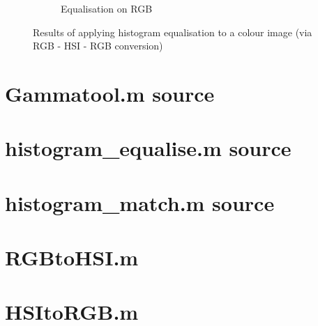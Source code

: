 \documentclass[a4paper]{article}
\begin{document}
\begin{figure}[!h]
\begin{subfigure}[b]{0.3\textwidth}
                \caption{Equalisation on RGB}
                \label{fig:5c}
        \end{subfigure}
        
        
        
        \caption{Results of applying histogram equalisation to a colour image (via RGB - HSI - RGB conversion)}
        \label{fig:45}
\end{figure}


\clearpage
\appendix 
\section{Gammatool.m source} 
\label{appendix-gammatool} 


\section{histogram\_equalise.m source} 
\label{appendix-hist-eq} 


\section{histogram\_match.m source} 
\label{appendix-hist-match} 


\section{RGBtoHSI.m}
\label{appendix-rgbhsi}


\section{HSItoRGB.m}
\label{appendix-hsirgb}

\end{document}

